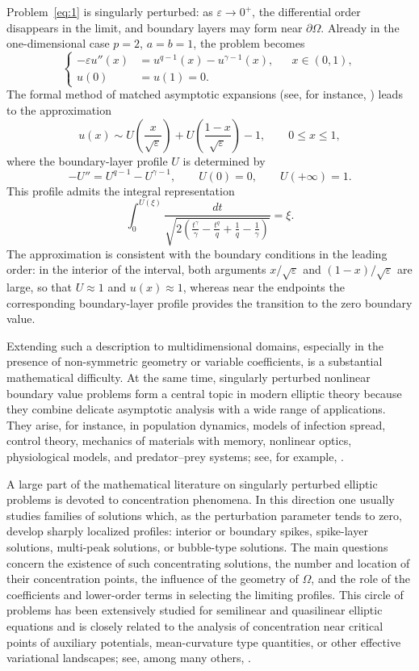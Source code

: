 \documentclass[preprint,11pt]{elsarticle}
\numberwithin{equation}{section}
\begin{document}
Problem~\eqref{eq:1} is singularly perturbed: as \(\varepsilon\to0^+\), the
differential order disappears in the limit, and boundary layers may form near
\(\partial\Omega\). Already in the one-dimensional case \(p=2\), \(a=b=1\),
the problem becomes
\begin{equation}\label{eq:11}
	\left\{
	\begin{aligned}
		-\varepsilon u''(x)
		&=
		u^{q-1}(x)-u^{\gamma-1}(x),
		&& x\in(0,1),\\
		u(0)&=u(1)=0 .
	\end{aligned}
	\right.
\end{equation}
The formal method of matched asymptotic expansions
(see, for instance, \cite{Ilin1989,Nayfeh}) leads to the approximation
\[
u(x)
\sim
U\!\left(\frac{x}{\sqrt{\varepsilon}}\right)
+
U\!\left(\frac{1-x}{\sqrt{\varepsilon}}\right)
-
1,
\qquad 0\le x\le1,
\]
where the boundary-layer profile \(U\) is determined by
\[
-U''=U^{q-1}-U^{\gamma-1},
\qquad
U(0)=0,\qquad
U(+\infty)=1 .
\]
This profile admits the integral representation
\[
\int_0^{U(\xi)}
\frac{dt}{
	\sqrt{
		2\left(
		\frac{t^\gamma}{\gamma}
		-
		\frac{t^q}{q}
		+
		\frac1q
		-
		\frac1\gamma
		\right)
	}
}
=
\xi .
\]
The approximation is consistent with the boundary conditions in the leading
order: in the interior of the interval, both arguments
\(x/\sqrt{\varepsilon}\) and \((1-x)/\sqrt{\varepsilon}\) are large, so that
\(U\approx1\) and \(u(x)\approx1\), whereas near the endpoints the
corresponding boundary-layer profile provides the transition to the zero
boundary value.

Extending such a description to multidimensional domains, especially in the
presence of non-symmetric geometry or variable coefficients, is a substantial
mathematical difficulty. At the same time, singularly perturbed nonlinear
boundary value problems form a central topic in modern elliptic theory because
they combine delicate asymptotic analysis with a wide range of applications.
They arise, for instance, in population dynamics, models of infection spread,
control theory, mechanics of materials with memory, nonlinear optics,
physiological models, and predator--prey systems; see, for example,
\cite{Kadalbajoo,Murray,Roos,Volpert}.

A large part of the mathematical literature on singularly perturbed elliptic
problems is devoted to concentration phenomena. In this direction one usually
studies families of solutions which, as the perturbation parameter tends to
zero, develop sharply localized profiles: interior or boundary spikes,
spike-layer solutions, multi-peak solutions, or bubble-type solutions. The
main questions concern the existence of such concentrating solutions, the
number and location of their concentration points, the influence of the
geometry of \(\Omega\), and the role of the coefficients and lower-order terms
in selecting the limiting profiles. This circle of problems has been
extensively studied for semilinear and quasilinear elliptic equations and is
closely related to the analysis of concentration near critical points of
auxiliary potentials, mean-curvature type quantities, or other effective
variational landscapes; see, among many others,
\cite{Ambros_Malch,Ambr_Mal_Ni,Badiale,Dancer,Howes,Lin,Ni,Vasil,Jager}.
\end{document}
